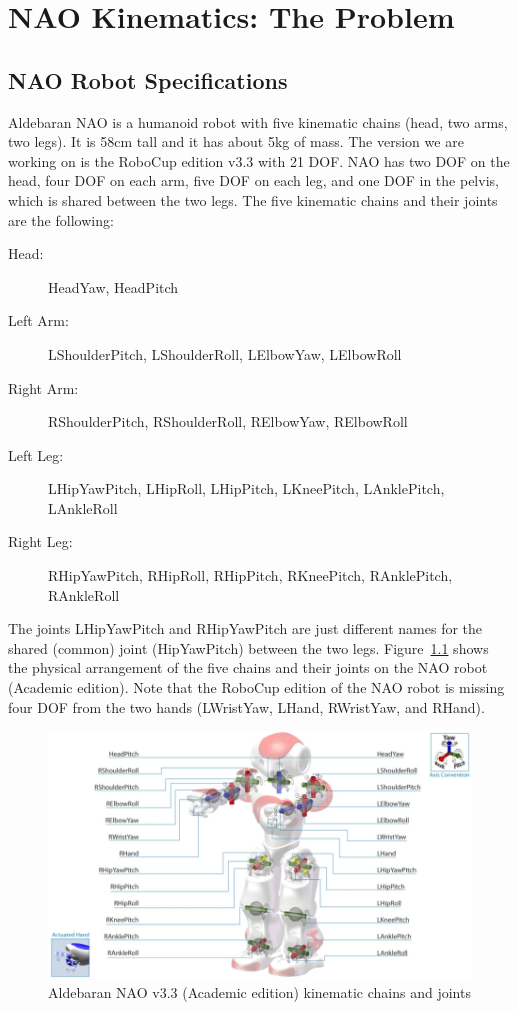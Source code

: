 
\chapter{NAO Kinematics: The Problem}
\label{problem}

\section{NAO Robot Specifications}
Aldebaran NAO is a humanoid robot with five kinematic chains (head, two arms, two legs). It is 58cm tall and it has about 5kg of mass. The version we are working on is the RoboCup edition v3.3 with 21 DOF. NAO has two DOF on the head, four DOF on each arm, five DOF on each leg, and one DOF in the pelvis, which is shared between the two legs. The five kinematic chains and their joints are the following:
\begin{description}
\item[Head:] HeadYaw, HeadPitch
\item[Left Arm:] LShoulderPitch, LShoulderRoll, LElbowYaw, LElbowRoll
\item[Right Arm:] RShoulderPitch, RShoulderRoll, RElbowYaw, RElbowRoll
\item[Left Leg:] LHipYawPitch, LHipRoll, LHipPitch, LKneePitch, LAnklePitch, LAnkleRoll
\item[Right Leg:]\hspace*{-0.3cm} RHipYawPitch, RHipRoll, RHipPitch, RKneePitch, RAnklePitch, RAnkleRoll
\end{description}
The joints LHipYawPitch and RHipYawPitch are just different names for the shared (common) joint (HipYawPitch) between the two legs. Figure~\ref{fig:NAO} shows the physical arrangement of the five chains and their joints on the NAO robot (Academic edition). Note that the RoboCup edition of the NAO robot is missing four DOF from the two hands (LWristYaw, LHand, RWristYaw, and RHand).

\begin{figure}[t!]
\begin{center}
\includegraphics[width=\textwidth]{Figures/nao-robot-dof.jpeg}
\caption{Aldebaran NAO v3.3 (Academic edition) kinematic chains and joints}
\label{fig:NAO}
\end{center}
\end{figure}



